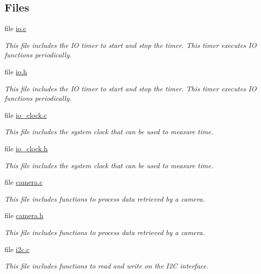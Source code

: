 \subsection*{Files}
\begin{DoxyCompactItemize}
\item 
file \hyperlink{io_8c}{io.\+c}
\begin{DoxyCompactList}\small\item\em This file includes the I\+O timer to start and stop the timer. This timer executes I\+O functions periodically. \end{DoxyCompactList}\item 
file \hyperlink{io_8h}{io.\+h}
\begin{DoxyCompactList}\small\item\em This file includes the I\+O timer to start and stop the timer. This timer executes I\+O functions periodically. \end{DoxyCompactList}\item 
file \hyperlink{io__clock_8c}{io\+\_\+clock.\+c}
\begin{DoxyCompactList}\small\item\em This file includes the system clock that can be used to measure time. \end{DoxyCompactList}\item 
file \hyperlink{io__clock_8h}{io\+\_\+clock.\+h}
\begin{DoxyCompactList}\small\item\em This file includes the system clock that can be used to measure time. \end{DoxyCompactList}\item 
file \hyperlink{camera_8c}{camera.\+c}
\begin{DoxyCompactList}\small\item\em This file includes functions to process data retrieved by a camera. \end{DoxyCompactList}\item 
file \hyperlink{camera_8h}{camera.\+h}
\begin{DoxyCompactList}\small\item\em This file includes functions to process data retrieved by a camera. \end{DoxyCompactList}\item 
file \hyperlink{i2c_8c}{i2c.\+c}
\begin{DoxyCompactList}\small\item\em This file includes functions to read and write on the I2\+C interface. \end{DoxyCompactList}\item 

\end{DoxyCompactItemize}
